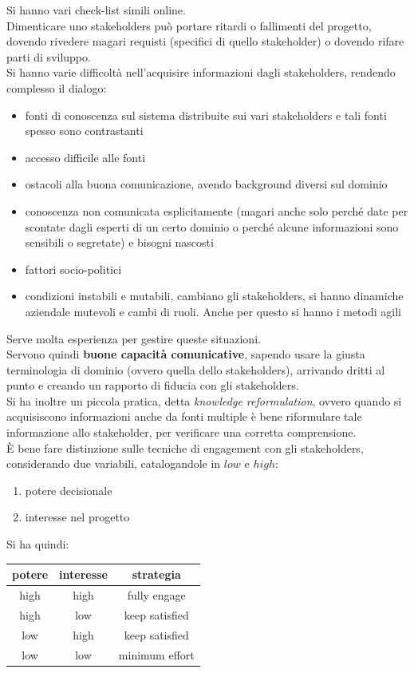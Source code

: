 \documentclass[a4paper,12pt, oneside]{book}
\begin{document}
Si hanno vari check-list simili online.\\
Dimenticare uno stakeholders può portare ritardi o fallimenti del progetto,
dovendo rivedere magari requisti (specifici di quello stakeholder) o dovendo
rifare parti di sviluppo.\\ 
Si hanno varie difficoltà nell'acquisire informazioni dagli stakeholders,
rendendo complesso il dialogo:
\begin{itemize}
  \item fonti di conoscenza sul sistema distribuite sui vari stakeholders e tali
  fonti spesso sono contrastanti 
  \item accesso difficile alle fonti 
  \item ostacoli alla buona comunicazione, avendo background diversi sul dominio
  \item conoscenza non comunicata esplicitamente (magari anche solo perché date
  per scontate dagli esperti di un certo dominio o perché alcune informazioni
  sono sensibili o segretate) e bisogni nascosti
  \item fattori socio-politici 
  \item condizioni instabili e mutabili, cambiano gli stakeholders, si hanno
  dinamiche aziendale mutevoli e cambi di ruoli. Anche per questo si hanno i
  metodi agili
\end{itemize}
Serve molta esperienza per gestire queste situazioni.\\
Servono quindi \textbf{buone capacità comunicative}, sapendo usare la giusta
terminologia di dominio (ovvero quella dello stakeholders), arrivando dritti al
punto e creando un rapporto di fiducia con gli stakeholders.\\
Si ha inoltre un piccola pratica, detta \textit{knowledge reformulation}, ovvero
quando si acquisiscono informazioni anche da fonti multiple è bene riformulare
tale informazione allo stakeholder, per verificare una corretta comprensione.\\
È bene fare distinzione sulle tecniche di engagement con gli stakeholders,
considerando due variabili, catalogandole in $low$ e $high$:
\begin{enumerate}
  \item potere decisionale
  \item interesse nel progetto
\end{enumerate}
Si ha quindi:
\begin{table}[H]
  \centering
  \begin{tabular}{c|c|c}
    potere & interesse & strategia\\
    \hline
    high & high & fully engage\\
    high & low & keep satisfied\\
    low & high & keep satisfied\\
    low & low & minimum effort
  \end{tabular}
\end{table}
\end{document}

